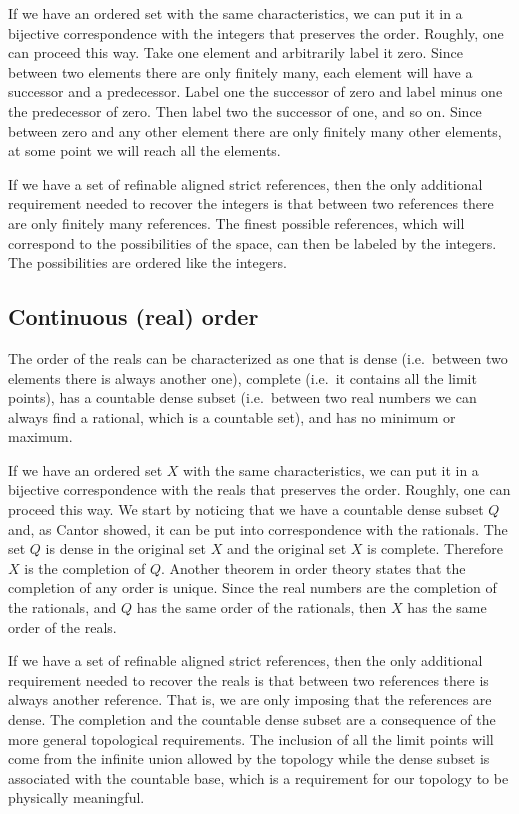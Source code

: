 \documentclass[12pt]{iopart}
\begin{document}
If we have an ordered set with the same characteristics, we can put it in a bijective correspondence with the integers that preserves the order. Roughly, one can proceed this way. Take one element and arbitrarily label it zero. Since between two elements there are only finitely many, each element will have a successor and a predecessor. Label one the successor of zero and label minus one the predecessor of zero. Then label two the successor of one, and so on. Since between zero and any other element there are only finitely many other elements, at some point we will reach all the elements.

If we have a set of refinable aligned strict references, then the only additional requirement needed to recover the integers is that between two references there are only finitely many references. The finest possible references, which will correspond to the possibilities of the space, can then be labeled by the integers. The possibilities are ordered like the integers.

\subsection{Continuous (real) order}

The order of the reals can be characterized as one that is dense (i.e.~between two elements there is always another one), complete (i.e.~it contains all the limit points), has a countable dense subset (i.e.~between two real numbers we can always find a rational, which is a countable set), and has no minimum or maximum. 

If we have an ordered set $X$ with the same characteristics, we can put it in a bijective correspondence with the reals that preserves the order. Roughly, one can proceed this way. We start by noticing that we have a countable dense subset $Q$ and, as Cantor showed, it can be put into correspondence with the rationals. The set $Q$ is dense in the original set $X$ and the original set $X$ is complete. Therefore $X$ is the completion of $Q$. Another theorem in order theory states that the completion of any order is unique. Since the real numbers are the completion of the rationals, and $Q$ has the same order of the rationals, then $X$ has the same order of the reals.

If we have a set of refinable aligned strict references, then the only additional requirement needed to recover the reals is that between two references there is always another reference. That is, we are only imposing that the references are dense. The completion and the countable dense subset are a consequence of the more general topological requirements. The inclusion of all the limit points will come from the infinite union allowed by the topology while the dense subset is associated with the countable base, which is a requirement for our topology to be physically meaningful.
\end{document}
